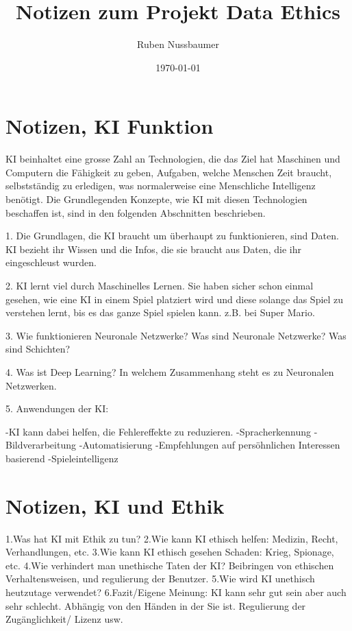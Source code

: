 \documentclass{article}
\title{Notizen zum Projekt Data Ethics}
\author{Ruben Nussbaumer}
\date{\today}
\begin{document}
\maketitle


\tableofcontents

\section{Notizen, KI Funktion}
KI beinhaltet eine grosse Zahl an Technologien, die das Ziel hat Maschinen und Computern die Fähigkeit
zu geben, Aufgaben, welche Menschen Zeit braucht, selbstständig zu erledigen, was normalerweise eine Menschliche Intelligenz benötigt.
Die Grundlegenden Konzepte, wie KI mit diesen Technologien beschaffen ist, sind in den folgenden Abschnitten beschrieben.

1. Die Grundlagen, die KI braucht um überhaupt zu funktionieren, sind Daten. KI bezieht ihr Wissen und die Infos, die sie braucht aus Daten, 
die ihr eingeschleust wurden.

2. KI lernt viel durch Maschinelles Lernen. Sie haben sicher schon einmal gesehen, wie eine KI in einem Spiel platziert wird und diese solange
das Spiel zu verstehen lernt, bis es das ganze Spiel spielen kann. z.B. bei Super Mario.

3. Wie funktionieren Neuronale Netzwerke? Was sind Neuronale Netzwerke? Was sind Schichten?

4. Was ist Deep Learning? In welchem Zusammenhang steht es zu Neuronalen Netzwerken.

5. Anwendungen der KI: 

    -KI kann dabei helfen, die Fehlereffekte zu reduzieren.
    -Spracherkennung
    -Bildverarbeitung
    -Automatisierung
    -Empfehlungen auf persöhnlichen Interessen basierend
    -Spieleintelligenz

 \section{Notizen, KI und Ethik}

 1.Was hat KI mit Ethik zu tun? 
 2.Wie kann KI ethisch helfen: Medizin, Recht, Verhandlungen, etc.
 3.Wie kann KI ethisch gesehen Schaden: Krieg, Spionage, etc.
 4.Wie verhindert man unethische Taten der KI? Beibringen von ethischen Verhaltensweisen, und regulierung der Benutzer.
 5.Wie wird KI unethisch heutzutage verwendet? 
 6.Fazit/Eigene Meinung: KI kann sehr gut sein aber auch sehr schlecht. Abhängig von den Händen in der Sie ist.
 Regulierung der Zugänglichkeit/ Lizenz usw.




\printbibliography
\end{document}
